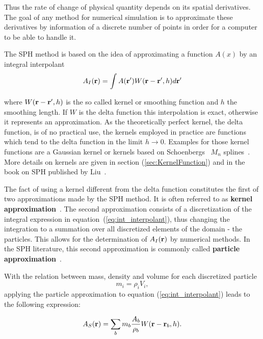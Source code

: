 \documentclass{report}
\begin{document}
Thus the rate of change of  physical quantity depends on its spatial
derivatives. The goal of any method for numerical simulation is to approximate
these derivatives by information of a discrete number of points in order for a
computer to be able to handle it. 

The SPH method is based on the idea of approximating a function $A(x)$ by an
integral interpolant
\begin{equation}
\label{eq:int_interpolant}
A_I({\bf r})=\int A({\bf r'})W({\bf r}-{\bf r'},h)d{\bf r'}
\end{equation}


where $W({\bf r}-{\bf r'},h)$ is the so called kernel or smoothing function and $h$ the
smoothing length. If $W$ is the delta function this interpolation is exact,
otherwise it represents an approximation. As the theoretically
perfect kernel, the delta function, is of no practical use, the kernels
employed in practice are functions which tend to the delta function in the 
limit $h\rightarrow 0$.
Examples for those kernel functions are a Gaussian kernel or
kernels based on Schoenbergs~\cite{Schoenberg1946} $M_n$ splines~\cite{Monaghan2005}.
More details on kernels are given in section
(\ref{sec:KernelFunction}) and in the book on SPH published by Liu~\cite{Liu2003}.

The fact of using a kernel different from the delta function constitutes the
first of two approximations made by the SPH
method. It is often referred to as {\bf kernel approximation}~\cite{Liu2003}.
The second approximation consists of a discretization of the integral
expression in equation~(\ref{eq:int_interpolant}), thus changing the integration
to a summation over all discretized elements of the domain - the particles. 
This allows for the determination of $A_I(\bf{r})$ by numerical methods. In the SPH
literature, this second approximation is commonly called {\bf particle
approximation}~\cite{Liu2003}.

With the relation between mass, density and volume for each discretized particle
\begin{equation}
m_i=\rho_i V_i,
\end{equation}
applying the particle approximation to equation (\ref{eq:int_interpolant}) leads to the following expression:

\begin{equation}
\label{eq:intInter}
A_S({\bf r})=\sum_b m_b \frac{A_b}{\rho_b}W({\bf r}-{\bf r}_b,h).
\end{equation}
\end{document}
